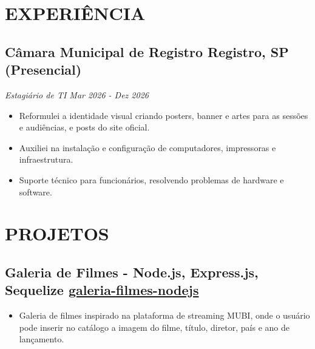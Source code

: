 \documentclass[a4paper,10pt]{article}
\begin{document}

\section{EXPERIÊNCIA }
    \subsection*{\texorpdfstring{
            \textbf{Câmara Municipal de Registro} \hfill Registro, SP (Presencial)
        }{
            Câmara Municipal de Registro -- Registro, SP (Presencial)
        }}
    \textit{Estagiário de TI  \hfill Mar 2026 - Dez 2026}
        \begin{itemize} 
            \item Reformulei a identidade visual criando posters, banner e artes para as sessões e audiências, e posts do site oficial.
            \item Auxiliei na instalação e configuração de computadores, impressoras e infraestrutura.
            \item Suporte técnico para funcionários, resolvendo problemas de hardware e software.
        \end{itemize}

\section{PROJETOS}
    \subsection*{\texorpdfstring{
            \textbf{Galeria de Filmes - Node.js, Express.js, Sequelize  } \hfill \href{https://github.com/amandafralve/galeria-filmes-nodejs}{galeria-filmes-nodejs}
        }{
            Nome da Empresa -- Localização
        }}  
        \begin{itemize} 
            \item Galeria de filmes inspirado
            na plataforma de streaming MUBI, onde o usuário pode inserir no catálogo a 
            imagem do filme, título, diretor, país e ano de lançamento.
            
        \end{itemize}
    
\end{document}
